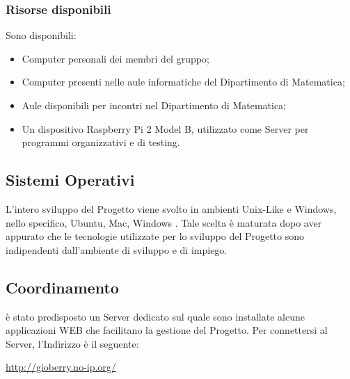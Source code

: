 {\subsubsection{Risorse disponibili}{
	Sono disponibili:
	\begin{itemize}
		\item Computer personali dei membri del gruppo;
		\item Computer presenti nelle aule informatiche del Dipartimento di Matematica;
		\item Aule disponibili per incontri nel Dipartimento di Matematica;
		\item Un dispositivo Raspberry Pi 2 Model B, utilizzato come Server per programmi organizzativi e di testing.
	\end{itemize}
}
}

\subsection{Sistemi Operativi}

L’intero sviluppo del Progetto viene svolto in ambienti Unix-Like e Windows, nello specifico, Ubuntu, Mac, Windows . Tale scelta è maturata dopo aver appurato che le tecnologie utilizzate per lo sviluppo del Progetto sono indipendenti dall’ambiente di sviluppo e di impiego.

\subsection{Coordinamento}
\label{sec:strumentiCoordinamento}
è stato predisposto un Server dedicato sul quale sono installate alcune applicazioni WEB
che facilitano la gestione del Progetto. Per connettersi al Server, l'Indirizzo è il seguente:\\
\begin{center}
\url{http://gioberry.no-ip.org/}
\end{center}
